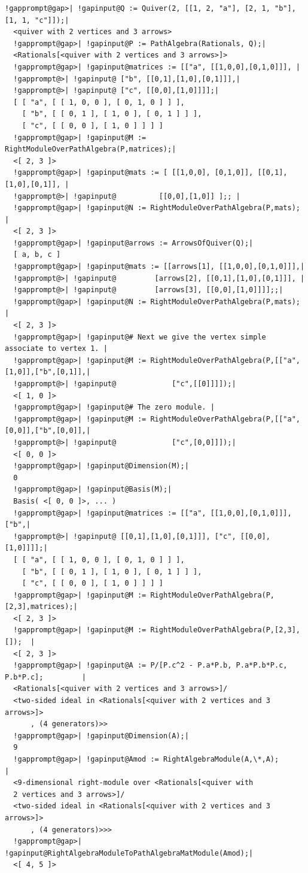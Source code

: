 \documentclass[a4paper,11pt]{report}
\begin{document}
{{ 
\begin{Verbatim}[commandchars=!@|,fontsize=\small,frame=single,label=Example]
  !gapprompt@gap>| !gapinput@Q := Quiver(2, [[1, 2, "a"], [2, 1, "b"],[1, 1, "c"]]);|
  <quiver with 2 vertices and 3 arrows>
  !gapprompt@gap>| !gapinput@P := PathAlgebra(Rationals, Q);|
  <Rationals[<quiver with 2 vertices and 3 arrows>]>
  !gapprompt@gap>| !gapinput@matrices := [["a", [[1,0,0],[0,1,0]]], |
  !gapprompt@>| !gapinput@ ["b", [[0,1],[1,0],[0,1]]],|
  !gapprompt@>| !gapinput@ ["c", [[0,0],[1,0]]]];|
  [ [ "a", [ [ 1, 0, 0 ], [ 0, 1, 0 ] ] ], 
    [ "b", [ [ 0, 1 ], [ 1, 0 ], [ 0, 1 ] ] ], 
    [ "c", [ [ 0, 0 ], [ 1, 0 ] ] ] ]
  !gapprompt@gap>| !gapinput@M := RightModuleOverPathAlgebra(P,matrices);|
  <[ 2, 3 ]>
  !gapprompt@gap>| !gapinput@mats := [ [[1,0,0], [0,1,0]], [[0,1],[1,0],[0,1]], |
  !gapprompt@>| !gapinput@          [[0,0],[1,0]] ];; |
  !gapprompt@gap>| !gapinput@N := RightModuleOverPathAlgebra(P,mats); |
  <[ 2, 3 ]>
  !gapprompt@gap>| !gapinput@arrows := ArrowsOfQuiver(Q);|
  [ a, b, c ]
  !gapprompt@gap>| !gapinput@mats := [[arrows[1], [[1,0,0],[0,1,0]]],|
  !gapprompt@>| !gapinput@         [arrows[2], [[0,1],[1,0],[0,1]]], |
  !gapprompt@>| !gapinput@         [arrows[3], [[0,0],[1,0]]]];;|
  !gapprompt@gap>| !gapinput@N := RightModuleOverPathAlgebra(P,mats); |
  <[ 2, 3 ]>
  !gapprompt@gap>| !gapinput@# Next we give the vertex simple associate to vertex 1. |
  !gapprompt@gap>| !gapinput@M := RightModuleOverPathAlgebra(P,[["a",[1,0]],["b",[0,1]],|
  !gapprompt@>| !gapinput@             ["c",[[0]]]]);|
  <[ 1, 0 ]>
  !gapprompt@gap>| !gapinput@# The zero module. |
  !gapprompt@gap>| !gapinput@M := RightModuleOverPathAlgebra(P,[["a",[0,0]],["b",[0,0]],|
  !gapprompt@>| !gapinput@             ["c",[0,0]]]);|
  <[ 0, 0 ]>
  !gapprompt@gap>| !gapinput@Dimension(M);|
  0
  !gapprompt@gap>| !gapinput@Basis(M);|
  Basis( <[ 0, 0 ]>, ... )
  !gapprompt@gap>| !gapinput@matrices := [["a", [[1,0,0],[0,1,0]]], ["b",|
  !gapprompt@>| !gapinput@ [[0,1],[1,0],[0,1]]], ["c", [[0,0],[1,0]]]];|
  [ [ "a", [ [ 1, 0, 0 ], [ 0, 1, 0 ] ] ], 
    [ "b", [ [ 0, 1 ], [ 1, 0 ], [ 0, 1 ] ] ], 
    [ "c", [ [ 0, 0 ], [ 1, 0 ] ] ] ]
  !gapprompt@gap>| !gapinput@M := RightModuleOverPathAlgebra(P,[2,3],matrices);|
  <[ 2, 3 ]>
  !gapprompt@gap>| !gapinput@M := RightModuleOverPathAlgebra(P,[2,3],[]);  |
  <[ 2, 3 ]>
  !gapprompt@gap>| !gapinput@A := P/[P.c^2 - P.a*P.b, P.a*P.b*P.c, P.b*P.c];         |
  <Rationals[<quiver with 2 vertices and 3 arrows>]/
  <two-sided ideal in <Rationals[<quiver with 2 vertices and 3 arrows>]>
      , (4 generators)>>
  !gapprompt@gap>| !gapinput@Dimension(A);|
  9
  !gapprompt@gap>| !gapinput@Amod := RightAlgebraModule(A,\*,A);                       |
  <9-dimensional right-module over <Rationals[<quiver with 
  2 vertices and 3 arrows>]/
  <two-sided ideal in <Rationals[<quiver with 2 vertices and 3 arrows>]>
      , (4 generators)>>>
  !gapprompt@gap>| !gapinput@RightAlgebraModuleToPathAlgebraMatModule(Amod);|
  <[ 4, 5 ]> 
\end{Verbatim}
 }

}
\end{document}
